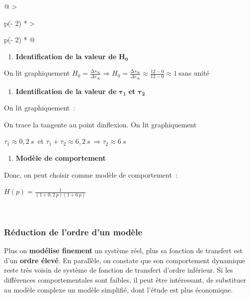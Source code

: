 \begin{longtable}[]{@{}
  >{\raggedright\arraybackslash}p{(\columnwidth - 2\tabcolsep) * }
  >{\raggedright\arraybackslash}p{(\columnwidth - 2\tabcolsep) * }@{}}
\begin{minipage}[b]{\linewidth}
\begin{enumerate}
\def\labelenumi{\arabic{enumi}.}
\setcounter{enumi}{1}
\item
  \textbf{Identification de la valeur de} \(\mathbf{H}_{\mathbf{0}}\)
\end{enumerate}

On lit graphiquement \(H_{0} = \frac{{\mathrm{\Delta}s}_{\infty}}{\Delta e_{\infty}} \Longrightarrow H_{0} = \frac{{\mathrm{\Delta}s}_{\infty}}{\Delta e_{\infty}} \approx \frac{12 - 0}{12 - 0} \approx 1\ \)sans unité

\begin{enumerate}
\def\labelenumi{\arabic{enumi}.}
\setcounter{enumi}{2}
\item
  \textbf{Identification de la valeur de} \(\mathbf{\tau}_{\mathbf{1}}\) \textbf{et} \(\mathbf{\tau}_{\mathbf{2}}\)
\end{enumerate}

On lit graphiquement~:

On trace la tangente au point d\textquotesingle inflexion. On lit graphiquement

\(\tau_{1} \approx 0,2\ s\ \) et \(\tau_{1} + \tau_{2} \approx 6,2\ s\  \Longrightarrow \tau_{2} \approx 6\ s\)

\begin{enumerate}
\def\labelenumi{\arabic{enumi}.}
\setcounter{enumi}{3}
\item
  \textbf{Modèle de comportement}
\end{enumerate}

Donc, on peut choisir comme modèle de comportement~:

\(H(p) = \frac{1}{(1 + 0,2\ p)(1 + 6\ p)}\)\strut
\end{minipage} \\
\midrule\noalign{}
\endhead
\bottomrule\noalign{}
\endlastfoot
\end{longtable}

\hypertarget{mod-ruxe9duction-de-lordre-dun-moduxe8le}{%
\subsubsection{Réduction de l'ordre d'un modèle}\label{mod-ruxe9duction-de-lordre-dun-moduxe8le}}

Plus on \textbf{modélise finement} un système réel, plus sa fonction de transfert est d'un \textbf{ordre élevé}. En parallèle, on constate que son comportement dynamique reste très voisin de système de fonction de transfert d'ordre inférieur. Si les différences comportementales sont faibles, il peut être intéressant, de substituer au modèle complexe un modèle simplifié, dont l'étude est plus économique.

